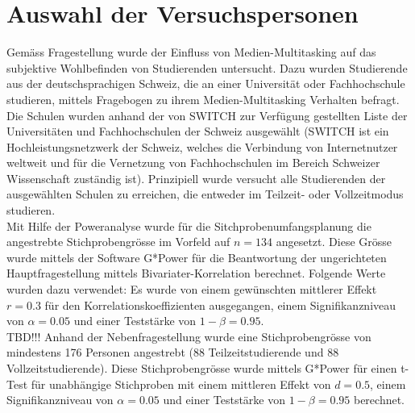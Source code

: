 \section{Auswahl der Versuchspersonen}\label{section.auswahlVersuchsp}
Gemäss Fragestellung wurde der Einfluss von Medien-Multitasking auf das subjektive Wohlbefinden von Studierenden untersucht. Dazu wurden Studierende aus der deutschsprachigen Schweiz, die an einer Universität oder Fachhochschule studieren, mittels Fragebogen zu ihrem Medien-Multitasking Verhalten befragt. Die Schulen wurden anhand der von SWITCH \cite{Switch2014} zur Verfügung gestellten Liste der Universitäten und Fachhochschulen der Schweiz ausgewählt (SWITCH ist ein Hochleistungsnetzwerk der Schweiz, welches die Verbindung von Internetnutzer weltweit und für die Vernetzung von Fachhochschulen im Bereich Schweizer Wissenschaft zuständig ist). Prinzipiell wurde versucht alle Studierenden der ausgewählten Schulen zu erreichen, die entweder im Teilzeit- oder Vollzeitmodus studieren. \\
Mit Hilfe der Poweranalyse \cite{Faul2009} wurde für die Sitchprobenumfangsplanung die angestrebte  Stichprobengrösse im Vorfeld auf $n = 134$ angesetzt. Diese Grösse wurde mittels der Software G*Power \cite{Faul2009} für die Beantwortung der ungerichteten Hauptfragestellung mittels Bivariater-Korrelation berechnet. Folgende Werte wurden dazu verwendet: Es wurde von einem gewünschten mittlerer Effekt $r = 0.3$  \cite{Cohen1988} für den Korrelationskoeffizienten ausgegangen, einem Signifikanzniveau von $\alpha=0.05$ und einer Teststärke von $1-\beta=0.95$.\\
TBD!!!
Anhand der Nebenfragestellung wurde eine Stichprobengrösse von mindestens 176 Personen angestrebt (88 Teilzeitstudierende und 88 Vollzeitstudierende). Diese Stichprobengrösse wurde mittels G*Power \cite{Faul2009} für einen t-Test für unabhängige Stichproben mit einem mittleren Effekt von $d = 0.5$, einem Signifikanzniveau von $\alpha=0.05$ und einer Teststärke von $1-\beta=0.95$ berechnet.

